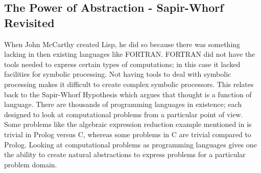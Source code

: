 \subsection{The Power of Abstraction - Sapir-Whorf Revisited}
When John McCarthy created Lisp, he did so because there was something lacking in then existing languages like FORTRAN. FORTRAN did not have the tools needed to express certain types of computations; in this case it lacked facilities for symbolic processing. Not having tools to deal with symbolic processing makes it difficult to create complex symbolic processors. This relates back to the Sapir-Whorf Hypothesis which argues that thought is a function of language. There are thousands of programming languages in existence; each designed to look at computational problems from a particular point of view. Some problems like the algebraic expression reduction example mentioned in  is trivial in Prolog versus C, whereas some problems in C are trivial compared to Prolog. Looking at computational problems as programming languages gives one the ability to create natural abstractions to express problems for a particular problem domain. 

